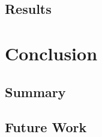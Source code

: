 \documentclass[11pt,titlepage,oneside,openany]{book}
\begin{document}
\section{Results}
\label{sec:results}


%
%


\chapter{Conclusion}
\label{cha:conclusion}


\section{Summary}
\label{sec:sum}


\section{Future Work}
\label{sec:future}






\appendix
\end{document}
